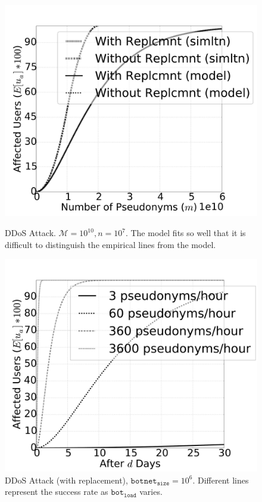 \documentclass{llncs} %
\begin{document}
\begin{figure}[!htb]
  \includegraphics[width=\linewidth]{sim_and_mod.pdf}
  \caption{DDoS Attack. $ \mathcal{M} = 10^{10}, n = 10^{7}$. The model fits so well that it is difficult to distinguish the empirical lines from the model.}\label{fig:simulation_and_modeling}
\endminipage\hfill
{}
  \includegraphics[width=\linewidth]{botplot.pdf}
  \caption{DDoS Attack (with replacement), $\texttt{botnet}_{\texttt{size}} = 10^6$. Different lines represent the success rate as $\texttt{bot}_{\texttt{load}}$ varies.}\label{fig:botplot}
\endminipage\hfill
\end{figure}
\end{document}
